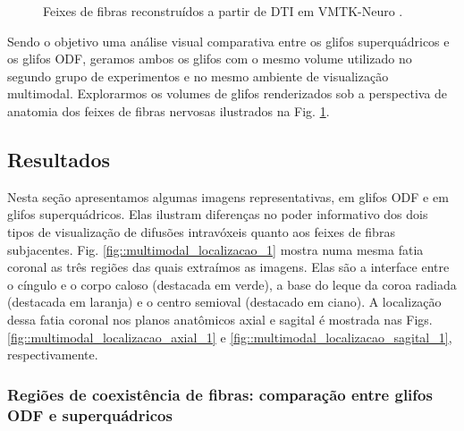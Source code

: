 \begin{figure}[H]
{    \label{fig::tratos_4}
    }
    \caption{Feixes de fibras reconstruídos a partir de DTI em VMTK-Neuro \cite{VMTKNeuro}.}
    \label{fig::tratos}
\end{figure}




Sendo o objetivo uma análise visual comparativa entre os glifos superquádricos \cite{Kindlmann2004} e os glifos ODF, geramos ambos os glifos com o mesmo volume utilizado no segundo grupo de experimentos e no mesmo ambiente de visualização multimodal.
Explorarmos os volumes de glifos renderizados sob a perspectiva de anatomia dos feixes de fibras nervosas ilustrados na Fig. \ref{fig::tratos}.


\subsection{Resultados}
\label{ssec::visual_resultados}

Nesta seção apresentamos algumas imagens representativas, em glifos ODF e em glifos superquádricos. Elas ilustram diferenças no poder informativo dos dois tipos de visualização de difusões intravóxeis quanto aos feixes de fibras subjacentes. Fig.  \ref{fig::multimodal_localizacao_1} mostra numa mesma fatia coronal as três regiões das quais extraímos as imagens.
Elas são a interface entre o cíngulo e o corpo caloso (destacada em verde), a base do leque da coroa radiada (destacada em laranja) e o centro semioval (destacado em ciano). A localização dessa fatia coronal nos planos anatômicos axial e sagital é mostrada nas Figs. \ref{fig::multimodal_localizacao_axial_1} e  \ref{fig::multimodal_localizacao_sagital_1}, respectivamente.%


\subsubsection{Regiões de coexistência de fibras: comparação entre glifos ODF e superquádricos}
\label{sssec::comparacao_glifosODF_superquadrico}

